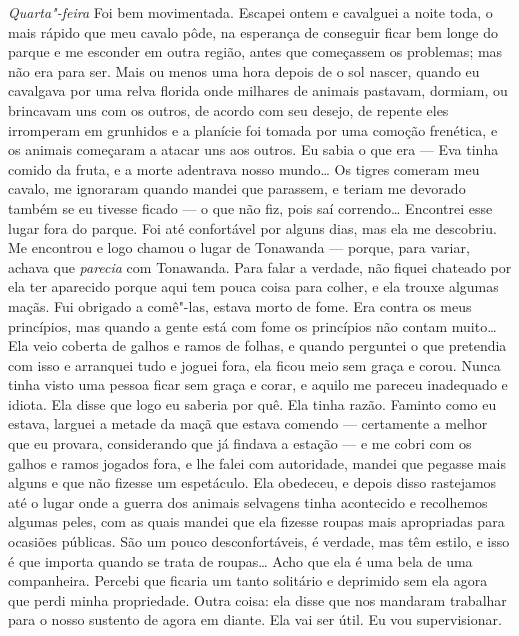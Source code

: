 \textit{Quarta"-feira}   Foi bem  movimentada. Escapei ontem e cavalguei a noite
toda, o mais rápido que meu cavalo pôde, na esperança de conseguir ficar
bem longe do parque e me esconder em outra região, antes que começassem os
problemas; mas não era para ser. Mais ou menos uma hora depois de o sol nascer,
quando eu cavalgava por uma relva florida onde milhares de animais pastavam, dormiam, 
ou brincavam uns com os outros, de acordo com seu desejo,
de repente eles irromperam em grunhidos e a planície foi tomada por uma comoção
frenética, e os animais começaram a atacar uns aos outros. Eu sabia o que era ---
Eva tinha comido da fruta, e a morte adentrava nosso mundo\ldots{} Os tigres
comeram meu cavalo, me ignoraram quando mandei que parassem, e teriam me
devorado também se eu tivesse ficado --- o que não fiz, pois saí correndo\ldots{}
Encontrei esse lugar fora do parque. Foi até confortável por alguns dias, mas
ela me descobriu. Me encontrou e logo chamou o lugar de Tonawanda --- porque,
para variar, achava que \textit{parecia} com Tonawanda. Para falar a verdade, não fiquei
chateado por ela ter aparecido porque aqui tem pouca coisa para colher, e ela
trouxe algumas maçãs. Fui obrigado a comê"-las, estava morto de fome. Era
contra os meus princípios, mas quando a gente está com fome os princípios não
contam muito\ldots{} Ela veio coberta de galhos e ramos de folhas, e quando
perguntei o que pretendia com isso e arranquei tudo e joguei fora, ela
ficou meio sem graça e corou. Nunca tinha visto uma pessoa ficar sem
graça e corar, e aquilo me pareceu inadequado e idiota. Ela disse que logo eu
saberia por quê. Ela tinha razão. Faminto como eu estava, larguei a metade da
maçã que estava comendo --- certamente a melhor que eu provara,
considerando que já findava a estação --- e me cobri com os galhos e ramos 
jogados fora, e lhe falei com autoridade, mandei que pegasse mais
alguns e que não fizesse um espetáculo. Ela obedeceu, e depois
disso rastejamos até o lugar onde a guerra dos animais selvagens tinha
acontecido e recolhemos algumas peles, com as quais mandei que ela fizesse roupas
mais apropriadas para ocasiões públicas. São um pouco desconfortáveis, é
verdade, mas têm estilo, e isso é que importa quando se trata de roupas\ldots{} Acho
que ela é uma bela de uma companheira. Percebi que ficaria um tanto
solitário e deprimido sem ela agora que perdi minha propriedade. Outra coisa:
ela disse que nos mandaram trabalhar para o nosso sustento de agora em diante.
Ela vai ser útil. Eu vou supervisionar.

